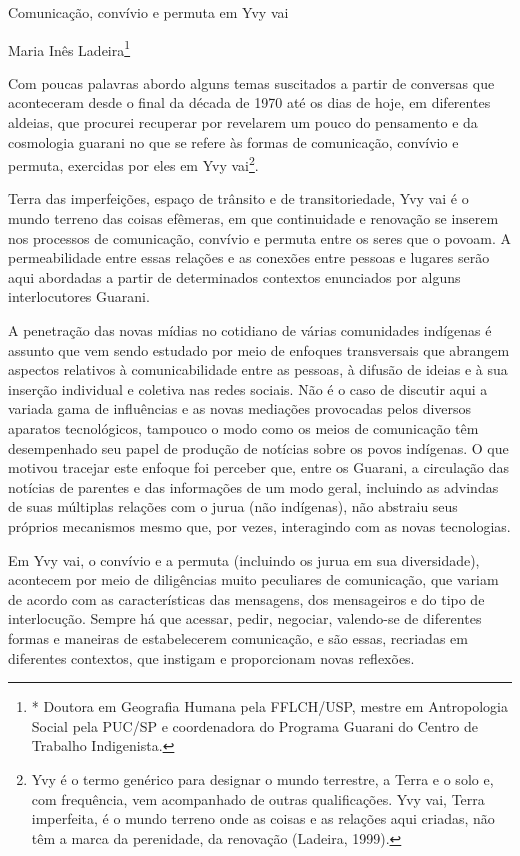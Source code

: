 \documentclass{article}
\begin{document}
Comunica\c{c}\~ao, conv\'ivio e permuta em Yvy vai

Maria In\^es Ladeira\footnote{* Doutora em Geografia Humana pela
FFLCH/USP, mestre em Antropologia Social pela PUC/SP e coordenadora do
Programa Guarani do Centro de Trabalho Indigenista.}

Com poucas palavras abordo alguns temas suscitados a partir de conversas
que aconteceram desde o final da d\'ecada de 1970 at\'e os dias de
hoje, em diferentes aldeias, que procurei recuperar por revelarem um
pouco do pensamento e da cosmologia guarani no que se refere \`as
formas de comunica\c{c}\~ao, conv\'ivio e permuta, exercidas por eles
em Yvy vai\footnote{ Yvy \'e o termo gen\'erico para designar o mundo
terrestre, a Terra e o solo e, com frequ\^encia, vem acompanhado de
outras qualifica\c{c}\~oes. Yvy vai, Terra imperfeita, \'e o mundo
terreno onde as coisas e as rela\c{c}\~oes aqui criadas, n\~ao t\^em a
marca da perenidade, da renova\c{c}\~ao (Ladeira, 1999). }.  

Terra das imperfei\c{c}\~oes, espa\c{c}o de tr\^ansito e de
transitoriedade, Yvy vai \'e o mundo terreno das coisas ef\^emeras, em
que continuidade e renova\c{c}\~ao se inserem nos processos de
comunica\c{c}\~ao, conv\'ivio e permuta entre os seres que o povoam. A
permeabilidade entre essas rela\c{c}\~oes e as conex\~oes entre pessoas
e lugares ser\~ao aqui abordadas a partir de determinados contextos
enunciados por alguns interlocutores Guarani. 

A penetra\c{c}\~ao das novas m\'idias no cotidiano de v\'arias
comunidades ind\'igenas \'e assunto que vem sendo estudado por meio de
enfoques transversais que abrangem aspectos relativos \`a
comunicabilidade entre as pessoas, \`a difus\~ao de ideias e \`a sua
inser\c{c}\~ao individual e coletiva nas redes sociais. N\~ao \'e o
caso de discutir aqui a variada gama de influ\^encias e as novas
media\c{c}\~oes provocadas pelos diversos aparatos tecnol\'ogicos,
tampouco o modo como os meios de comunica\c{c}\~ao t\^em desempenhado
seu papel de produ\c{c}\~ao de not\'icias sobre os povos ind\'igenas. O
que motivou tracejar este enfoque foi perceber que, entre os Guarani, a
circula\c{c}\~ao das not\'icias de parentes e das informa\c{c}\~oes de
um modo geral, incluindo as advindas de suas m\'ultiplas rela\c{c}\~oes
com o jurua (n\~ao ind\'igenas), n\~ao abstraiu seus pr\'oprios
mecanismos mesmo que, por vezes, interagindo com as novas tecnologias.

Em Yvy vai, o conv\'ivio e a permuta (incluindo os jurua em sua
diversidade), acontecem por meio de dilig\^encias muito peculiares de
comunica\c{c}\~ao, que variam de acordo com as caracter\'isticas das
mensagens, dos mensageiros e do tipo de interlocu\c{c}\~ao. Sempre h\'a
que acessar, pedir, negociar, valendo-se de diferentes formas e
maneiras de estabelecerem comunica\c{c}\~ao, e s\~ao essas, recriadas
em diferentes contextos, que instigam e proporcionam novas reflex\~oes.
\end{document}
